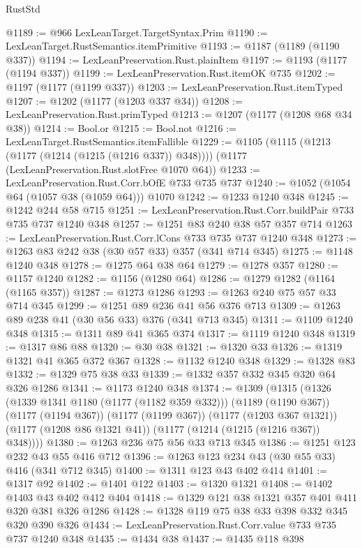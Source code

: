 \begin{lexlean}{RustStd}
\begin{coremodule}
@1189 := @966 LexLeanTarget.TargetSyntax.Prim
@1190 := LexLeanTarget.RustSemantics.itemPrimitive
@1193 := @1187 (@1189 (@1190 @337))
@1194 := LexLeanPreservation.Rust.plainItem
@1197 := @1193 (@1177 (@1194 @337))
@1199 := LexLeanPreservation.Rust.itemOK @735
@1202 := @1197 (@1177 (@1199 @337))
@1203 := LexLeanPreservation.Rust.itemTyped
@1207 := @1202 (@1177 (@1203 @337 @34))
@1208 := LexLeanPreservation.Rust.primTyped
@1213 := @1207 (@1177 (@1208 @68 @34 @38))
@1214 := Bool.or
@1215 := Bool.not
@1216 := LexLeanTarget.RustSemantics.itemFallible
@1229 := @1105
    (@1115 (@1213 (@1177 (@1214 (@1215 (@1216 @337)) @348))))
    (@1177 (LexLeanPreservation.Rust.slotFree @1070 @64))
@1233 := LexLeanPreservation.Rust.Corr.bOfE @733 @735 @737
@1240 := @1052 (@1054 @64 (@1057 @38 (@1059 @64))) @1070
@1242 := @1233 @1240 @348
@1245 := @1242 @244 @58 @715
@1251 := LexLeanPreservation.Rust.Corr.buildPair @733 @735 @737 @1240 @348
@1257 := @1251 @83 @240 @38 @57 @357 @714
@1263 := LexLeanPreservation.Rust.Corr.lCons @733 @735 @737 @1240 @348
@1273 := @1263 @83 @242 @38 (@30 @57 @33) @357 (@341 @714 @345)
@1275 := @1148 @1240 @348
@1278 := @1275 @64 @38 @64
@1279 := @1278 @357
@1280 := @1157 @1240
@1282 := @1156 (@1280 @64)
@1286 := @1279 @1282 (@1164 (@1165 @357))
@1287 := @1273 @1286
@1293 := @1263 @240 @75 @57 @33 @714 @345
@1299 := @1251 @89 @236 @41 @56 @376 @713
@1309 := @1263 @89 @238 @41 (@30 @56 @33) @376 (@341 @713 @345)
@1311 := @1109 @1240 @348
@1315 := @1311 @89 @41 @365 @374
@1317 := @1119 @1240 @348
@1319 := @1317 @86 @88
@1320 := @30 @38
@1321 := @1320 @33
@1326 := @1319 @1321 @41 @365 @372 @367
@1328 := @1132 @1240 @348
@1329 := @1328 @83
@1332 := @1329 @75 @38 @33
@1339 := @1332 @357 @332 @345 @320 @64 @326 @1286
@1341 := @1173 @1240 @348
@1374 := @1309
    (@1315
      (@1326
        (@1339 @1341 @1180 (@1177 (@1182 @359 @332)))
        (@1189 (@1190 @367))
        (@1177 (@1194 @367))
        (@1177 (@1199 @367))
        (@1177 (@1203 @367 @1321))
        (@1177 (@1208 @86 @1321 @41))
        (@1177 (@1214 (@1215 (@1216 @367)) @348))))
@1380 := @1263 @236 @75 @56 @33 @713 @345
@1386 := @1251 @123 @232 @43 @55 @416 @712
@1396 := @1263 @123 @234 @43 (@30 @55 @33) @416 (@341 @712 @345)
@1400 := @1311 @123 @43 @402 @414
@1401 := @1317 @92
@1402 := @1401 @122
@1403 := @1320 @1321
@1408 := @1402 @1403 @43 @402 @412 @404
@1418 := @1329 @121 @38 @1321 @357 @401 @411 @320 @381 @326 @1286
@1428 := @1328 @119 @75 @38 @33 @398 @332 @345 @320 @390 @326
@1434 := LexLeanPreservation.Rust.Corr.value @733 @735 @737 @1240 @348
@1435 := @1434 @38
@1437 := @1435 @118 @398

\end{coremodule}
\end{lexlean}
